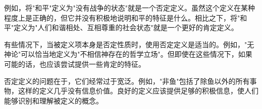 例如，将"和平"定义为"没有战争的状态"就是一个否定定义。虽然这个定义在某种程度上是正确的，但它并没有积极地说明和平的特征是什么。相比之下，将"和平"定义为"人们和谐相处、互相尊重的社会状态"就是一个更好的肯定定义。

有些情况下，当被定义项本身是否定性质时，使用否定定义是适当的。例如，"无神论"可以恰当地定义为"不相信神存在的哲学立场"。但即使在这些情况下，如果可能的话，也应该尝试提供一些肯定的特征。

否定定义的问题在于，它们经常过于宽泛。例如，"非鱼"包括了除鱼以外的所有事物，这样的定义几乎没有信息价值。良好的定义应该提供足够的积极信息，使人们能够识别和理解被定义的概念。

\begin{center}
\end{center} 